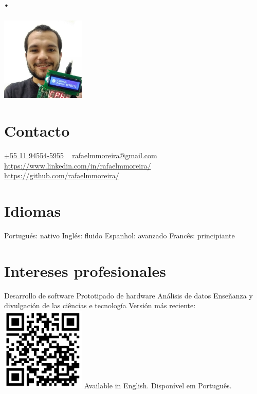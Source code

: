 \documentclass[espanol]{cv-style}          %
\begin{document}
\lastupdated


\begin{aside}
\section{.}
\flushleft%
\includegraphics[width=4cm]{photo}
\section{Contacto}
\href{https://wa.me/5511945545955}{+55 11 94554-5955}
~
\href{mailto:rafaelmmoreira@gmail.com}{rafaelmmoreira@gmail.com}
~
\url{https://www.linkedin.com/in/rafaelmmoreira/}
~
\url{https://github.com/rafaelmmoreira/}
%
\section{Idiomas}
Portugués: nativo
Inglés: fluido
Espanhol: avanzado
Francês: principiante
%
\section{Intereses profesionales}
Desarrollo de software
Prototipado de hardware
Análisis de datos
Enseñanza y divulgación de las ciências e tecnología
%
\vspace{3.7cm}
Versión más reciente:
\includegraphics[width=4cm]{qrcode}
Available in English.
Disponível em Português.
%
\end{aside}
\end{document}
